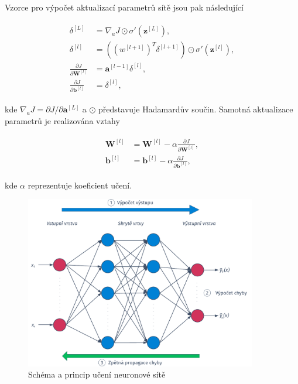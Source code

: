 \noindent Vzorce pro výpočet aktualizací parametrů sítě jsou pak následující

\begin{align}
  \begin{split}
    \delta^{[L]} & = \nabla_{a} J \odot \sigma'\left(\mathbf{z}^{[L]}\right), \\
    \delta^{[l]} & = \left(\left(w^{[l+1]}\right)^T \delta^{[l+1]}\right) \odot \sigma'\left(\mathbf{z}^{[l]}\right), \\
    \frac{\partial J}{\partial \mathbf{W}^{[l]}} & = \mathbf{a}^{[l-1]}\delta^{[l]}, \\
    \frac{\partial J}{\partial \mathbf{b}^{[l]}} & = \delta^{[l]},
  \end{split}
  \label{eq:asr:acoustic:dnn:bp}
\end{align}

\noindent kde $\nabla_a J = \partial J / \partial \mathbf{a}^{[L]}$ a $\odot$ představuje Hadamardův součin. Samotná aktualizace parametrů je realizována vztahy

\begin{align}
  \begin{split}
    \mathbf{W}^{[l]} & = \mathbf{W}^{[l]} - \alpha \frac{\partial J}{\partial \mathbf{W}^{[l]}}, \\
    \mathbf{b}^{[l]} & = \mathbf{b}^{[l]} - \alpha \frac{\partial J}{\partial \mathbf{b}^{[l]}},
  \end{split}
  \label{eq:asr:acoustic:dnn:update}
\end{align}

\noindent kde $\alpha$ reprezentuje koeficient učení.

\begin{figure}[hbpt]
  \centering
  \includegraphics[width=0.9\textwidth]{./ch4-asr/img/dnn-training.pdf}
  \caption{Schéma a princip učení neuronové sítě}
  \label{fig:asr:acoustic:dnn:training}
\end{figure}

